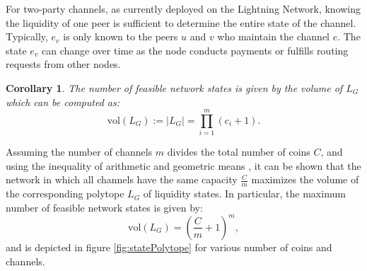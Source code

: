 \documentclass[10pt,twocolumn]{article}
\newtheorem{corollary}{Corollary}[theorem]
\begin{document}
For two-party channels, as currently deployed on the Lightning Network, knowing the liquidity of one peer is sufficient to determine the entire state of the channel. Typically, \( e_v \) is only known to the peers \( u \) and \( v \) who maintain the channel \( e \). The state \( e_v \) can change over time as the node conducts payments or fulfills routing requests from other nodes.



\begin{corollary}
The number of feasible network states is given by the volume of \( L_G \) which can be computed as:
\[ \text{vol}(L_G) := |L_G| = \prod_{i=1}^m (c_i + 1). \]
\end{corollary}

Assuming the number of channels \( m \) divides the total number of coins \( C \), and using the inequality of arithmetic and geometric means \cite{steele2004cauchy}, it can be shown that the network in which all channels have the same capacity \( \frac{C}{m} \) maximizes the volume of the corresponding polytope \( L_G \) of liquidity states. 
In particular, the maximum number of feasible network states is given by:
\[ \text{vol}(L_G) = \left( \frac{C}{m} + 1 \right)^m, \]
and is depicted in figure \ref{fig:statePolytope} for various number of coins and channels.
\end{document}
